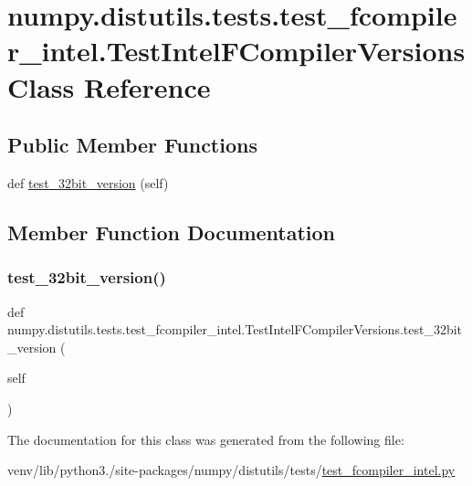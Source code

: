 \hypertarget{classnumpy_1_1distutils_1_1tests_1_1test__fcompiler__intel_1_1TestIntelFCompilerVersions}{}\section{numpy.\+distutils.\+tests.\+test\+\_\+fcompiler\+\_\+intel.\+Test\+Intel\+F\+Compiler\+Versions Class Reference}
\label{classnumpy_1_1distutils_1_1tests_1_1test__fcompiler__intel_1_1TestIntelFCompilerVersions}
\subsection*{Public Member Functions}
\begin{DoxyCompactItemize}
\item 
def \hyperlink{classnumpy_1_1distutils_1_1tests_1_1test__fcompiler__intel_1_1TestIntelFCompilerVersions_add4635c51f96bf863db840ccf1febcf0}{test\+\_\+32bit\+\_\+version} (self)
\end{DoxyCompactItemize}


\subsection{Member Function Documentation}
\mbox{\label{classnumpy_1_1distutils_1_1tests_1_1test__fcompiler__intel_1_1TestIntelFCompilerVersions_add4635c51f96bf863db840ccf1febcf0}} 
\subsubsection{\texorpdfstring{test\+\_\+32bit\+\_\+version()}{test\_32bit\_version()}}
{\footnotesize\ttfamily def numpy.\+distutils.\+tests.\+test\+\_\+fcompiler\+\_\+intel.\+Test\+Intel\+F\+Compiler\+Versions.\+test\+\_\+32bit\+\_\+version (\begin{DoxyParamCaption}\item[{}]{self }\end{DoxyParamCaption})}



The documentation for this class was generated from the following file\+:\begin{DoxyCompactItemize}
\item 
venv/lib/python3./site-\/packages/numpy/distutils/tests/\hyperlink{test__fcompiler__intel_8py}{test\+\_\+fcompiler\+\_\+intel.\+py}\end{DoxyCompactItemize}
